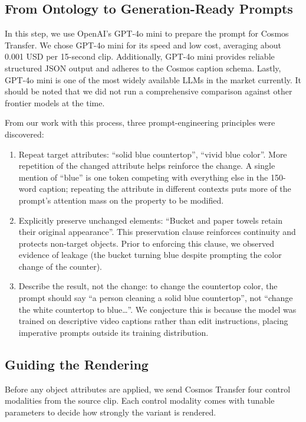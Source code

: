 \documentclass[runningheads]{llncs}
\begin{document}
\subsection{From Ontology to Generation-Ready Prompts}

In this step, we use OpenAI's GPT-4o mini \cite{r14} to prepare the prompt for Cosmos Transfer. We chose GPT-4o mini for its speed and low cost, averaging about 0.001 USD per 15-second clip. Additionally, GPT-4o mini provides reliable structured JSON output and adheres to the Cosmos caption schema. Lastly, GPT-4o mini is one of the most widely available LLMs in the market currently. It should be noted that we did not run a comprehensive comparison against other frontier models at the time.

From our work with this process, three prompt-engineering principles were discovered:

\begin{enumerate}
\item Repeat target attributes: ``solid blue countertop'', ``vivid blue color''. More repetition of the changed attribute helps reinforce the change. A single mention of ``blue'' is one token competing with everything else in the 150-word caption; repeating the attribute in different contexts puts more of the prompt's attention mass on the property to be modified.
\item Explicitly preserve unchanged elements: ``Bucket and paper towels retain their original appearance''. This preservation clause reinforces continuity and protects non-target objects. Prior to enforcing this clause, we observed evidence of leakage (the bucket turning blue despite prompting the color change of the counter).
\item Describe the result, not the change: to change the countertop color, the prompt should say ``a person cleaning a solid blue countertop'', not ``change the white countertop to blue\ldots''. We conjecture this is because the model was trained on descriptive video captions rather than edit instructions, placing imperative prompts outside its training distribution.
\end{enumerate}

\subsection{Guiding the Rendering}

Before any object attributes are applied, we send Cosmos Transfer four control modalities from the source clip. Each control modality comes with tunable parameters to decide how strongly the variant is rendered.
\end{document}
